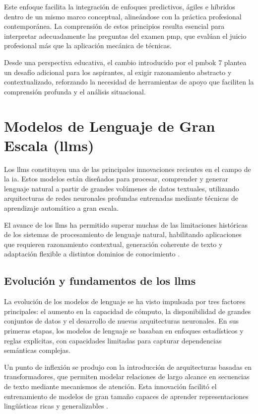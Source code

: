 Este enfoque facilita la integración de enfoques predictivos, ágiles e híbridos dentro de un mismo marco conceptual, alineándose con la práctica profesional contemporánea. La comprensión de estos principios resulta esencial para interpretar adecuadamente las preguntas del examen \gls{pmp}, que evalúan el juicio profesional más que la aplicación mecánica de técnicas.

Desde una perspectiva educativa, el cambio introducido por el \gls{pmbok} 7 plantea un desafío adicional para los aspirantes, al exigir razonamiento abstracto y contextualizado, reforzando la necesidad de herramientas de apoyo que faciliten la comprensión profunda y el análisis situacional.

\section{Modelos de Lenguaje de Gran Escala (\glspl{llm})}

Los \glspl{llm} constituyen una de las principales innovaciones recientes en el campo de la \gls{ia}. Estos modelos están diseñados para procesar, comprender y generar lenguaje natural a partir de grandes volúmenes de datos textuales, utilizando arquitecturas de redes neuronales profundas entrenadas mediante técnicas de aprendizaje automático a gran escala.

El avance de los \glspl{llm} ha permitido superar muchas de las limitaciones históricas de los sistemas de procesamiento de lenguaje natural, habilitando aplicaciones que requieren razonamiento contextual, generación coherente de texto y adaptación flexible a distintos dominios de conocimiento \parencite{zhao2023survey}.

\subsection{Evolución y fundamentos de los \glspl{llm}}

La evolución de los modelos de lenguaje se ha visto impulsada por tres factores principales: el aumento en la capacidad de cómputo, la disponibilidad de grandes conjuntos de datos y el desarrollo de nuevas arquitecturas neuronales. En sus primeras etapas, los modelos de lenguaje se basaban en enfoques estadísticos y reglas explícitas, con capacidades limitadas para capturar dependencias semánticas complejas.

Un punto de inflexión se produjo con la introducción de arquitecturas basadas en transformadores, que permiten modelar relaciones de largo alcance en secuencias de texto mediante mecanismos de atención. Esta innovación facilitó el entrenamiento de modelos de gran tamaño capaces de aprender representaciones lingüísticas ricas y generalizables \parencite{zhao2023survey}.

